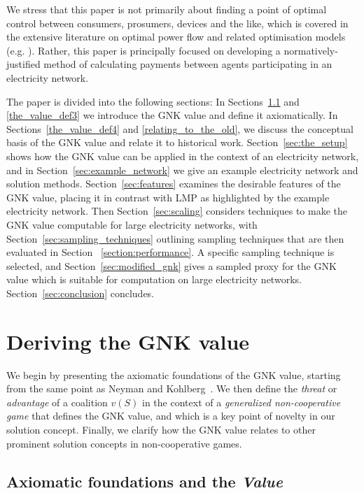 We stress that this paper is not primarily about finding a point of optimal control between consumers, prosumers, devices and the like, which is covered in the extensive literature on optimal power flow and related optimisation models (e.g. \cite{battery3,battery1,battery2}).
Rather, this paper is principally focused on developing a normatively-justified method of calculating payments between agents participating in an electricity network.

The paper is divided into the following sections: 
In Sections~\ref{the_value_def} and \ref{the_value_def3} we introduce the GNK value and define it axiomatically. 
In Sections~\ref{the_value_def4} and \ref{relating_to_the_old}, we discuss the conceptual basis of the GNK value and relate it to historical work.
Section~\ref{sec:the_setup} shows how the GNK value can be applied in the context of an electricity network, 
and in Section~\ref{sec:example_network} we give an example electricity network and solution methods.
Section~\ref{sec:features} examines the desirable features of the GNK value, placing it in contrast with LMP as highlighted by the example electricity network.
Then Section~\ref{sec:scaling} considers techniques to make the GNK value computable for large electricity networks, with Section~\ref{sec:sampling_techniques} outlining sampling techniques that are then evaluated in Section ~\ref{section:performance}. 
A specific sampling technique is selected, and Section~\ref{sec:modified_gnk} gives a sampled proxy for the GNK value which is suitable for computation on large electricity networks.
Section~\ref{sec:conclusion} concludes.


\section{Deriving the GNK value}\label{the_value_def2}

We begin by presenting the axiomatic foundations of the GNK value, starting from the same point as Neyman and Kohlberg~\cite{value2}.
We then define the \emph{threat} or \emph{advantage} of a coalition $v(S)$ in the context of a \textit{generalized non-cooperative game} that defines the GNK value, and which is a key point of novelty in our solution concept.
Finally, we clarify how the GNK value relates to other prominent solution concepts in non-cooperative games.


\subsection{Axiomatic foundations and the \textit{Value}}\label{the_value_def}

